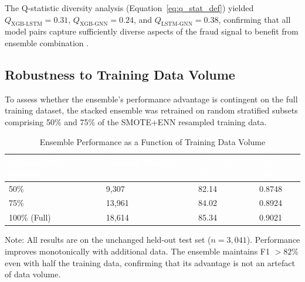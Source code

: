 \documentclass[12pt,a4paper,oneside]{report}
\numberwithin{equation}{chapter}
\renewcommand{\arraystretch}{1.6}
\begin{document}
The Q-statistic diversity analysis (Equation~\ref{eq:q_stat_def}) yielded
$Q_{\text{XGB-LSTM}} = 0.31$, $Q_{\text{XGB-GNN}} = 0.24$, and
$Q_{\text{LSTM-GNN}} = 0.38$, confirming that all model pairs capture sufficiently diverse
aspects of the fraud signal to benefit from ensemble combination \cite{Eteng2025}.

\subsection{Robustness to Training Data Volume}

To assess whether the ensemble's performance advantage is contingent on the full training dataset,
the stacked ensemble was retrained on random stratified subsets comprising 50\% and 75\% of the
SMOTE+ENN resampled training data.

\begin{table}[H]
\centering
\caption{Ensemble Performance as a Function of Training Data Volume}
\label{tab:data-scaling}
\renewcommand{\arraystretch}{1.4}
\begin{threeparttable}
\begin{tabular}{L{4.5cm} C{3cm} C{3cm} C{3cm}}
\toprule
{}
\textcolor{white}{\textbf{Training Data Volume}} &
\textcolor{white}{\textbf{Training Samples ($n$)}} &
\textcolor{white}{\textbf{F1-Score (\%)}} &
\textcolor{white}{\textbf{AUC-PR}} \\
\midrule
{}
50\%        & 9{,}307  & 82.14 & 0.8748 \\
75\%        & 13{,}961 & 84.02 & 0.8924 \\
100\% (Full) & 18{,}614 & 85.34 & 0.9021 \\
\bottomrule
\end{tabular}
\begin{tablenotes}
\small
\item Note: All results are on the unchanged held-out test set ($n = 3{,}041$). Performance improves
monotonically with additional data. The ensemble maintains F1 $> 82\%$ even with half the training
data, confirming that its advantage is not an artefact of data volume.
\end{tablenotes}
\end{threeparttable}
\end{table}
\end{document}
